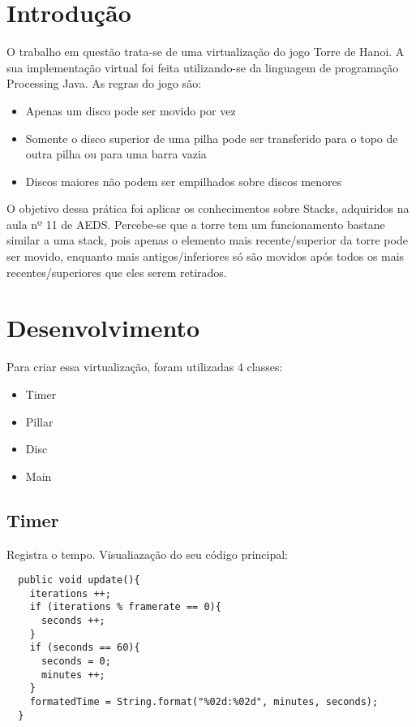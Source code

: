 \documentclass[
	12pt,				%
	oneside,			%
	a4paper,			%
	english,			%
	brazil,				%
	]{abntex2}
\begin{document}
\frenchspacing 

\imprimircapa

{
\ABNTEXchapterfont

\textual

\section{Introdução}

O trabalho em questão trata-se de uma virtualização do jogo Torre de Hanoi. A sua implementação virtual foi feita utilizando-se da linguagem de programação Processing Java. As regras do jogo são:

\begin{itemize}
\item Apenas um disco pode ser movido por vez
\item Somente o disco superior de uma pilha pode ser transferido para o topo de outra pilha ou para uma barra vazia
\item Discos maiores não podem ser empilhados sobre discos menores
\end{itemize}

O objetivo dessa prática foi aplicar os conhecimentos sobre Stacks, adquiridos na aula nº 11 de AEDS. Percebe-se que a torre tem um funcionamento bastane similar a uma stack, pois apenas o elemento mais recente/superior da torre pode ser movido, enquanto mais antigos/inferiores só são movidos após todos os mais recentes/superiores que eles serem retirados.

\section{Desenvolvimento}

Para criar essa virtualização, foram utilizadas 4 classes: 
\begin{itemize}
 \item Timer
 \item Pillar
 \item Disc
 \item Main
\end{itemize}

 \subsection{Timer}
 Registra o tempo. Visualiazação do seu código principal:
  \begin{itshape}
 \begin{verbatim}
  public void update(){
    iterations ++;
    if (iterations % framerate == 0){
      seconds ++;
    }
    if (seconds == 60){
      seconds = 0;
      minutes ++;
    }
    formatedTime = String.format("%02d:%02d", minutes, seconds); 
  }
 \end{verbatim}
 \end{itshape}
}
\end{document}
